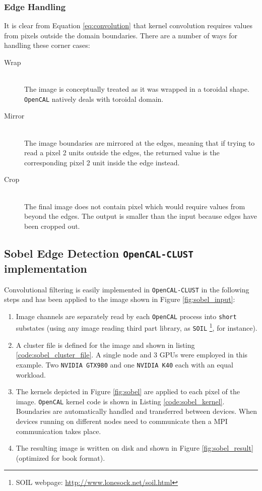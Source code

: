 \subsubsection{Edge Handling}
It is clear from Equation \ref{eq:convolution} that kernel convolution requires values from pixels outside the domain boundaries. There are a number of ways for handling these corner cases:
\begin{description}
    \item[Wrap] \hfill \\The image is conceptually treated as it was wrapped in a toroidal shape. \texttt{OpenCAL} natively deals with toroidal domain.
    \item[Mirror] \hfill \\
    The image boundaries are mirrored at the edges, meaning that if trying to read a pixel 2 units outside the edges, the returned value is the corresponding pixel 2 unit inside the edge instead.
    \item [Crop]\hfill \\
    The final image does not contain pixel which would require values from beyond the edges. The output is smaller than the input because edges have been cropped out.
\end{description}


\subsection{Sobel Edge Detection \texttt{OpenCAL-CLUST} implementation}
\label{sec:convolutional_filters_example}
Convolutional filtering is easily implemented in \texttt{OpenCAL-CLUST} in the following steps and has been applied to the image shown in Figure \ref{fig:sobel_input}:
\begin{enumerate}
    \item Image channels are separately read by each \texttt{OpenCAL} process into \texttt{short} substates (using any image reading third part library, as \texttt{SOIL} \footnote{SOIL webpage: \url{http://www.lonesock.net/soil.html}}, for instance).
    \item A cluster file is defined for the image and shown in listing \ref{code:sobel_cluster_file}. A single node and 3 GPUs were employed in this example. Two \texttt{NVIDIA GTX980} and one \texttt{NVIDIA K40} each with an equal workload.
    \item The kernels depicted in Figure \ref{fig:sobel} are applied to each pixel of the image. \texttt{OpenCAL} kernel code is shown in Listing \ref{code:sobel_kernel}.  Boundaries are automatically handled and transferred  between devices. When devices running on different nodes need to communicate then a MPI communication takes place.
    \item The resulting image is written on disk and  shown in Figure \ref{fig:sobel_result} (optimized for book format).
\end{enumerate}

